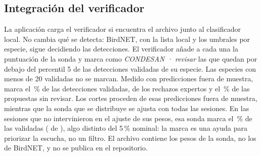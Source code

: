 \subsection{Integración del verificador}\label{sec:verificador}
La aplicación carga el verificador si encuentra el archivo  junto al clasificador local. No cambia qué se detecta:
BirdNET, con la lista local y los umbrales por especie, sigue decidiendo las detecciones. El verificador añade a cada una la puntuación de la sonda y
marca como \emph{CONDESAN · revisar} las que quedan por debajo del percentil 5 de las detecciones validadas de su especie. Las especies con menos de
20 validadas no se marcan. Medido con predicciones fuera de muestra, marca el \deepFlagValid\,\% de las detecciones validadas, \deepFlagRejected{} de los
\deepFlagRejectedOf{} rechazos expertos y el \deepFlagUnreviewed\,\% de las propuestas sin revisar. Los cortes proceden de esas predicciones fuera de muestra,
mientras que la sonda que se distribuye se ajusta con todas las sesiones. En las sesiones que no intervinieron en el ajuste de sus pesos, esa sonda
marca el \deepFlagHeldValid\,\% de las validadas (\deepFlagHeldMarked{} de \deepFlagHeldOf), algo distinto del 5\,\% nominal: la marca es una ayuda para
priorizar la escucha, no un filtro. El archivo contiene los pesos de la sonda, no los de BirdNET, y no se publica en el repositorio.

